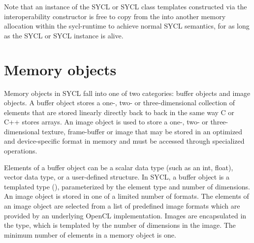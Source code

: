 Note that an instance of the SYCL  or SYCL  class templates constructed via the interoperability constructor is free to copy from the  into another memory allocation within the \gls{sycl-runtime} to achieve normal SYCL semantics, for as long as the SYCL  or SYCL  instance is alive.

\section{Memory objects}

Memory objects in SYCL fall into one of two categories: \gls{buffer} objects
and \gls{image} objects. A buffer object stores a one-, two- or
three-dimensional collection of elements that are stored linearly directly back
to back in the same way C or C++ stores arrays. An image object is used to store
a one-, two- or three-dimensional texture, frame-buffer or image that may be
stored in an optimized and device-specific format in memory and must be accessed
through specialized operations.

Elements of a buffer object can be a scalar data type (such as an int, float),
vector data type, or a user-defined structure. In SYCL, a \gls{buffer} object is a
templated type (), parameterized by the element
type and number of dimensions. An \gls{image} object is stored in one of a limited
number of formats. The elements of an image object are selected from a list of
predefined image formats which are provided by an underlying OpenCL
implementation.  Images are encapsulated in the 
type, which is templated by the number of dimensions in the image. The minimum
number of elements in a memory object is one.

